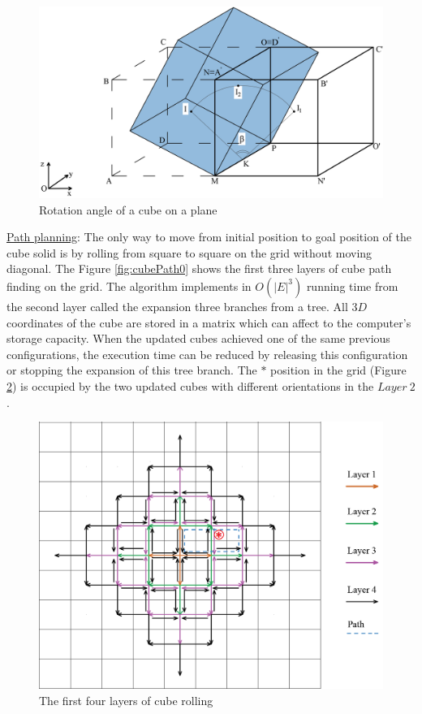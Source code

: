 \begin{figure}[H]
\centering
	\includegraphics[width=1\textwidth]{image/cubeGeo1.png}
	\caption{Rotation angle of a cube on a plane}
	\label{fig:cubeGeo1}
\end{figure}

\noindent\uline{Path planning}: 
The only way to move from initial position to goal position of the cube solid is by rolling from square to square on the grid without moving diagonal. 
The Figure \ref{fig:cubePath0} shows the first three layers of cube path finding on the grid. 
The algorithm implements in $O(|E|^3)$ running time from the second layer called the expansion three branches from a tree. 
All $3D$ coordinates of the cube are stored in a matrix which can affect to the computer's storage capacity. 
When the updated cubes achieved one of the same previous configurations, the execution time can be reduced by releasing this configuration or stopping the expansion of this tree branch.
The $*$ position in the grid (Figure \ref{fig:cubeLayer}) is occupied by the two updated cubes with different orientations in the $Layer\ 2$. \\

\begin{figure}[H]
\centering
	\includegraphics[width=1\textwidth]{image/cubePath00.png}
	\caption{The first four layers of cube rolling}
	\label{fig:cubeLayer}
\end{figure}
%

